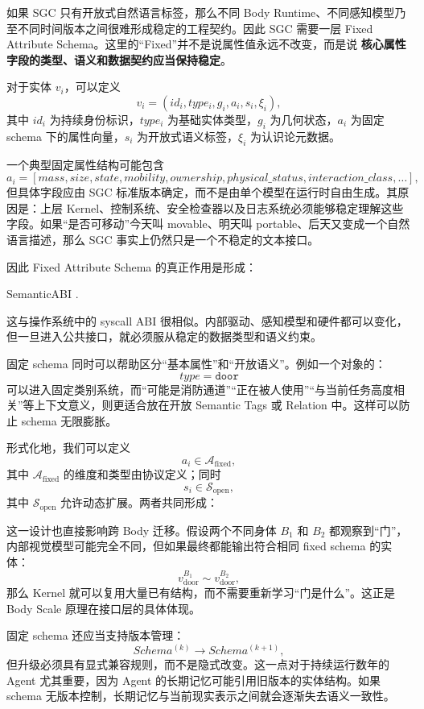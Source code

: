 如果 SGC 只有开放式自然语言标签，那么不同 Body Runtime、不同感知模型乃至不同时间版本之间很难形成稳定的工程契约。因此 SGC 需要一层 Fixed Attribute Schema。这里的“Fixed”并不是说属性值永远不改变，而是说
\textbf{核心属性字段的类型、语义和数据契约应当保持稳定}。

对于实体 $v_i$，可以定义
\[
v_i=
\left(
id_i,
type_i,
g_i,
a_i,
s_i,
\xi_i
\right),
\]
其中 $id_i$ 为持续身份标识，$type_i$ 为基础实体类型，$g_i$ 为几何状态，$a_i$ 为固定 schema 下的属性向量，$s_i$ 为开放式语义标签，$\xi_i$ 为认识论元数据。

一个典型固定属性结构可能包含
\[
a_i=
[
mass,
size,
state,
mobility,
ownership,
physical\_status,
interaction\_class,
\ldots
],
\]
但具体字段应由 SGC 标准版本确定，而不是由单个模型在运行时自由生成。其原因是：上层 Kernel、控制系统、安全检查器以及日志系统必须能够稳定理解这些字段。如果“是否可移动”今天叫 movable、明天叫 portable、后天又变成一个自然语言描述，那么 SGC 事实上仍然只是一个不稳定的文本接口。

因此 Fixed Attribute Schema 的真正作用是形成：
\begin{statementbox}
SemanticABI .
\end{statementbox}
这与操作系统中的 syscall ABI 很相似。内部驱动、感知模型和硬件都可以变化，但一旦进入公共接口，就必须服从稳定的数据类型和语义约束。

固定 schema 同时可以帮助区分“基本属性”和“开放语义”。例如一个对象的：
\[
type = \texttt{door}
\]
可以进入固定类别系统，而“可能是消防通道”“正在被人使用”“与当前任务高度相关”等上下文意义，则更适合放在开放 Semantic Tags 或 Relation 中。这样可以防止 schema 无限膨胀。

形式化地，我们可以定义
\[
a_i\in\mathcal A_{\mathrm{fixed}},
\]
其中 $\mathcal A_{\mathrm{fixed}}$ 的维度和类型由协议定义；同时
\[
s_i\in\mathcal S_{\mathrm{open}},
\]
其中 $\mathcal S_{\mathrm{open}}$ 允许动态扩展。两者共同形成：
\begin{statementbox}
\centering
{}
\end{statementbox}

这一设计也直接影响跨 Body 迁移。假设两个不同身体 $B_1$ 和 $B_2$ 都观察到“门”，内部视觉模型可能完全不同，但如果最终都能输出符合相同 fixed schema 的实体：
\[
v_{\mathrm{door}}^{B_1}
\sim
v_{\mathrm{door}}^{B_2},
\]
那么 Kernel 就可以复用大量已有结构，而不需要重新学习“门是什么”。这正是 Body Scale 原理在接口层的具体体现。

固定 schema 还应当支持版本管理：
\[
Schema^{(k)}
\rightarrow
Schema^{(k+1)},
\]
但升级必须具有显式兼容规则，而不是隐式改变。这一点对于持续运行数年的 Agent 尤其重要，因为 Agent 的长期记忆可能引用旧版本的实体结构。如果 schema 无版本控制，长期记忆与当前现实表示之间就会逐渐失去语义一致性。

